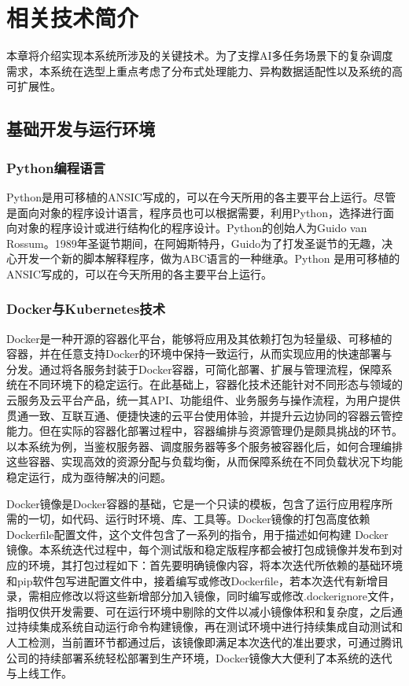 \chapter{相关技术简介}

本章将介绍实现本系统所涉及的关键技术。为了支撑AI多任务场景下的复杂调度需求，本系统在选型上重点考虑了分布式处理能力、异构数据适配性以及系统的高可扩展性。

\section{基础开发与运行环境}

\subsection{Python编程语言}

Python是用可移植的ANSIC写成的，可以在今天所用的各主要平台上运行。尽管是面向对象的程序设计语言，程序员也可以根据需要，利用Python，选择进行面向对象的程序设计或进行结构化的程序设计\cite{11, 13}。Python的创始人为Guido van Rossum。1989年圣诞节期间，在阿姆斯特丹，Guido为了打发圣诞节的无趣，决心开发一个新的脚本解释程序，做为ABC语言的一种继承\cite{12}。Python 是用可移植的ANSIC写成的，可以在今天所用的各主要平台上运行。

\subsection{Docker与Kubernetes技术}

Docker是一种开源的容器化平台，能够将应用及其依赖打包为轻量级、可移植的容器，并在任意支持Docker的环境中保持一致运行，从而实现应用的快速部署与分发\cite{8}。通过将各服务封装于Docker容器，可简化部署、扩展与管理流程，保障系统在不同环境下的稳定运行。在此基础上，容器化技术还能针对不同形态与领域的云服务及云平台产品，统一其API、功能组件、业务服务与操作流程，为用户提供贯通一致、互联互通、便捷快速的云平台使用体验，并提升云边协同的容器云管控能力。但在实际的容器化部署过程中，容器编排与资源管理仍是颇具挑战的环节。以本系统为例，当鉴权服务器、调度服务器等多个服务被容器化后，如何合理编排这些容器、实现高效的资源分配与负载均衡，从而保障系统在不同负载状况下均能稳定运行，成为亟待解决的问题。

Docker镜像是Docker容器的基础，它是一个只读的模板，包含了运行应用程序所需的一切，如代码、运行时环境、库、工具等。Docker镜像的打包高度依赖Dockerfile配置文件，这个文件包含了一系列的指令，用于描述如何构建 Docker 镜像。本系统迭代过程中，每个测试版和稳定版程序都会被打包成镜像并发布到对应的环境，其打包过程如下：首先要明确镜像内容，将本次迭代所依赖的基础环境和pip软件包写进配置文件中，接着编写或修改Dockerfile，若本次迭代有新增目录，需相应修改以将这些新增部分加入镜像，同时编写或修改.dockerignore文件，指明仅供开发需要、可在运行环境中剔除的文件以减小镜像体积和复杂度，之后通过持续集成系统自动运行命令构建镜像，再在测试环境中进行持续集成自动测试和人工检测，当前置环节都通过后，该镜像即满足本次迭代的准出要求，可通过腾讯公司的持续部署系统轻松部署到生产环境，Docker镜像大大便利了本系统的迭代与上线工作。


